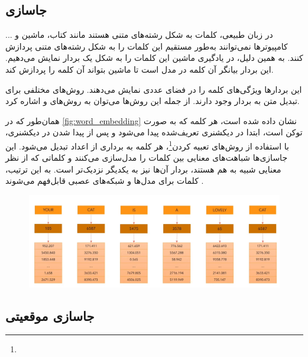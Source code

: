 \subsection{جاسازی}
در زبان طبیعی، کلمات به شکل رشته‌های متنی هستند مانند کتاب، ماشین و ... کامپیوترها نمی‌توانند به‌طور مستقیم این کلمات را به شکل رشته‌های متنی پردازش کنند. به همین دلیل، در یادگیری ماشین این کلمات را به شکل یک بردار نمایش می‌دهیم. این بردار بیانگر آن کلمه در مدل است تا ماشین بتواند آن کلمه را پردازش کند.

این بردارها ویژگی‌های کلمه را در فضای عددی نمایش می‌دهند. روش‌های مختلفی برای تبدیل متن به بردار وجود دارند. از جمله این روش‌ها می‌توان به روش‌های  \cite{mikolov2013distributed} و  \cite{pennington2014glove} اشاره کرد.

همان‌طور که در \autoref{fig:word_embedding} نشان داده شده است، هر کلمه که به صورت توکن است، ابتدا در دیکشنری تعریف‌شده پیدا می‌شود و پس از پیدا شدن در دیکشنری، با استفاده از روش‌های تعبیه کردن\footnote{}، هر کلمه به برداری از اعداد تبدیل می‌شود. این جاسازی‌ها شباهت‌های معنایی بین کلمات را مدل‌سازی می‌کنند و کلماتی که از نظر معنایی شبیه به هم هستند، بردار آن‌ها نیز به یکدیگر نزدیک‌تر است. به این ترتیب، کلمات برای مدل‌ها و شبکه‌های عصبی قابل‌فهم می‌شوند \cite{mikolov2013distributed,pennington2014glove}.





 \begin{figure}[h]
 	\centering
 	\begin{minipage}[b]{0.7\textwidth}
 		\centering
 		\includegraphics[width=\textwidth]{transformer_images/word_embedding.png}
 		\caption{}
 		\label{fig:word_embedding}
 	\end{minipage}
 	\hfill
 \end{figure}



\subsection{جاسازی موقعیتی}

